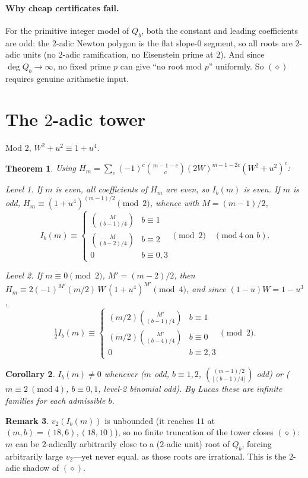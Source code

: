 \documentclass[11pt]{article}
\newtheorem{theorem}{Theorem}
\newtheorem{corollary}[theorem]{Corollary}
\theoremstyle{definition}
\newtheorem{remark}[theorem]{Remark}
\begin{document}
\paragraph{Why cheap certificates fail.} For the primitive integer model of $Q_b$, both the
constant and leading coefficients are odd: the $2$-adic Newton polygon is the flat slope-$0$
segment, so all roots are $2$-adic units (no $2$-adic ramification, no Eisenstein prime at
$2$). And since $\deg Q_b\to\infty$, no fixed prime $p$ can give ``no root mod $p$''
uniformly. So $(\diamond)$ requires genuine arithmetic input.

\section{The $2$-adic tower}
Mod $2$, $W^2+u^2\equiv 1+u^4$.
\begin{theorem}\label{thm:tower}
Using $H_m=\sum_c(-1)^c\binom{m-1-c}{c}(2W)^{m-1-2c}(W^2+u^2)^c$:

\emph{Level 1.} If $m$ is even, all coefficients of $H_m$ are even, so $I_b(m)$ is even. If
$m$ is odd, $H_m\equiv(1+u^4)^{(m-1)/2}\pmod2$, whence with $M=(m-1)/2$,
\[
  I_b(m)\equiv
  \begin{cases}
    \binom{M}{(b-1)/4} & b\equiv1\\
    \binom{M}{(b-2)/4} & b\equiv2\\
    0 & b\equiv0,3
  \end{cases}\pmod2\quad(\mathrm{mod}\ 4\ \text{on }b).
\]

\emph{Level 2.} If $m\equiv0\pmod2$, $M'=(m-2)/2$, then $H_m\equiv 2(-1)^{M'}(m/2)\,W\,(1+u^4)^{M'}\pmod4$,
and since $(1-u)W=1-u^3$,
\[
  \tfrac12 I_b(m)\equiv
  \begin{cases}
    (m/2)\binom{M'}{(b-1)/4} & b\equiv1\\
    (m/2)\binom{M'}{(b-4)/4} & b\equiv0\\
    0 & b\equiv2,3
  \end{cases}\pmod2.
\]
\end{theorem}
\begin{corollary}
$I_b(m)\neq0$ whenever ($m$ odd, $b\equiv1,2$, $\binom{(m-1)/2}{\lfloor(b-1)/4\rfloor}$ odd)
or ($m\equiv2\ (\mathrm{mod}\ 4)$, $b\equiv0,1$, level-2 binomial odd). By Lucas these are
infinite families for each admissible $b$.
\end{corollary}
\begin{remark}
$v_2(I_b(m))$ is unbounded (it reaches $11$ at $(m,b)=(18,6),(18,10)$), so no finite
truncation of the tower closes $(\diamond)$: $m$ can be $2$-adically arbitrarily close to a
($2$-adic unit) root of $Q_b$, forcing arbitrarily large $v_2$---yet never equal, as those
roots are irrational. This is the $2$-adic shadow of $(\diamond)$.
\end{remark}
\end{document}
